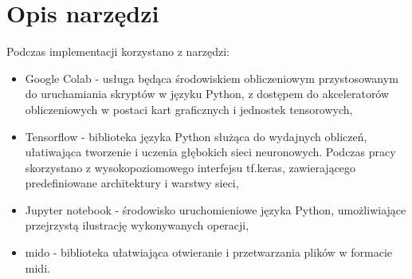 {  \section{Opis narzędzi}
  {
    Podczas implementacji korzystano z narzędzi:
    \begin{itemize}
      \item Google Colab - usługa będąca środowiskiem obliczeniowym przystosowanym 
      do uruchamiania skryptów w języku Python, z dostępem do akceleratorów obliczeniowych
      w postaci kart graficznych i jednostek tensorowych,
      \item Tensorflow - biblioteka języka Python służąca do wydajnych obliczeń, ułatiwająca 
      tworzenie i uczenia głębokich sieci neuronowych. Podczas pracy skorzystano z 
      wysokopoziomowego interfejsu tf.keras, zawierającego predefiniowane architektury i warstwy sieci,
      \item Jupyter notebook - środowisko uruchomieniowe języka Python, umożliwiające przejrzystą
      ilustrację wykonywanych operacji,
      \item mido - biblioteka ułatwiająca otwieranie i przetwarzania plików w formacie midi.
    \end{itemize}
  }
}
